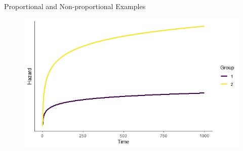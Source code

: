 \documentclass[10pt,t]{beamer}
\begin{document}
\begin{frame}{Proportional and Non-proportional Examples}
\begin{figure}
		\includegraphics[scale = 0.15]{figs/prop_hazard_2}
	\end{figure}
\medskip
	

\end{frame}
\end{document}
